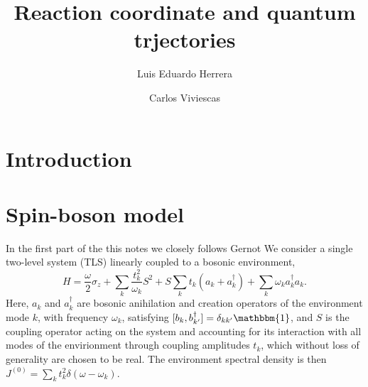 \documentclass[%
preprint,
onecolumn,
notitlepag,
 amsmath,amssymb,
 aps,
 pra,
]{revtex4-2}
\begin{document}
\title[]{Reaction coordinate and quantum trjectories}
\author{Luis Eduardo Herrera}
\author{Carlos Viviescas}
\begin{abstract}
\end{abstract}
	
\maketitle
%
\section{Introduction}
\section{Spin-boson model}
In the first part of the this notes we closely follows Gernot 
We consider a single two-level system (TLS) linearly coupled to a bosonic environment, 
\begin{equation}
\label{eq:H_SB}
H = \frac{\omega}{2} \sigma_{z}+\sum_{k} \frac{t_{k}^{2}}{\omega_{k}} S^{2}+S \sum_{k} t_{k}\left(a_{k}+a_{k}^{\dagger}\right)+\sum_{k} \omega_{k} a_{k}^{\dagger} a_{k}.
\end{equation}
Here, $a_{k}$ and $a^{\dagger}_{k}$ are bosonic anihilation and creation operators of the environment mode $k$, with frequency $\omega_{k}$, satisfying $[b_{k},b^{\dagger}_{k'}] = \delta_{kk'} \mathbbm{1}$, and $S$ is the coupling operator acting on the system and accounting for its interaction with all modes of the envirionment through coupling amplitudes $t_{k}$, which without loss of generality are chosen to be real. The environment spectral density is then $J^{(0)} = \sum_{k} t_{k}^2 \delta (\omega -  \omega_{k})$.
\end{document}
